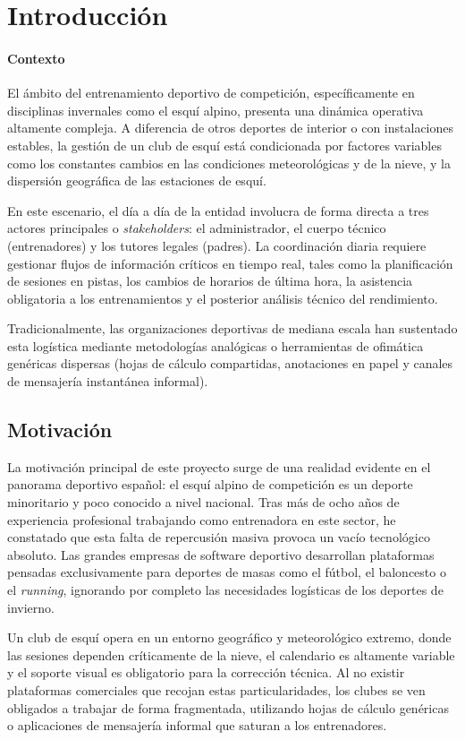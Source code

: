 \chapter{Introducción}
    \subsubsection{Contexto}
    El ámbito del entrenamiento deportivo de competición, específicamente en disciplinas invernales como el esquí alpino, presenta una dinámica operativa altamente compleja. A diferencia de otros deportes de interior o con instalaciones estables, la gestión de un club de esquí está condicionada por factores variables como los constantes cambios en las condiciones meteorológicas y de la nieve, y la dispersión geográfica de las estaciones de esquí.

    En este escenario, el día a día de la entidad involucra de forma directa a tres actores principales o \textit{stakeholders}: el administrador, el cuerpo técnico (entrenadores) y los tutores legales (padres). La coordinación diaria requiere gestionar flujos de información críticos en tiempo real, tales como la planificación de sesiones en pistas, los cambios de horarios de última hora, la asistencia obligatoria a los entrenamientos y el posterior análisis técnico del rendimiento.

    Tradicionalmente, las organizaciones deportivas de mediana escala han sustentado esta logística mediante metodologías analógicas o herramientas de ofimática genéricas dispersas (hojas de cálculo compartidas, anotaciones en papel y canales de mensajería instantánea informal). 
    \newpage

    \section{Motivación}
    La motivación principal de este proyecto surge de una realidad evidente en el panorama deportivo español: el esquí alpino de competición es un deporte minoritario y poco conocido a nivel nacional. Tras más de ocho años de experiencia profesional trabajando como entrenadora en este sector, he constatado que esta falta de repercusión masiva provoca un vacío tecnológico absoluto. Las grandes empresas de software deportivo desarrollan plataformas pensadas exclusivamente para deportes de masas como el fútbol, el baloncesto o el \textit{running}, ignorando por completo las necesidades logísticas de los deportes de invierno. 

    Un club de esquí opera en un entorno geográfico y meteorológico extremo, donde las sesiones dependen críticamente de la nieve, el calendario es altamente variable y el soporte visual es obligatorio para la corrección técnica. Al no existir plataformas comerciales que recojan estas particularidades, los clubes se ven obligados a trabajar de forma fragmentada, utilizando hojas de cálculo genéricas o aplicaciones de mensajería informal que saturan a los entrenadores. 

